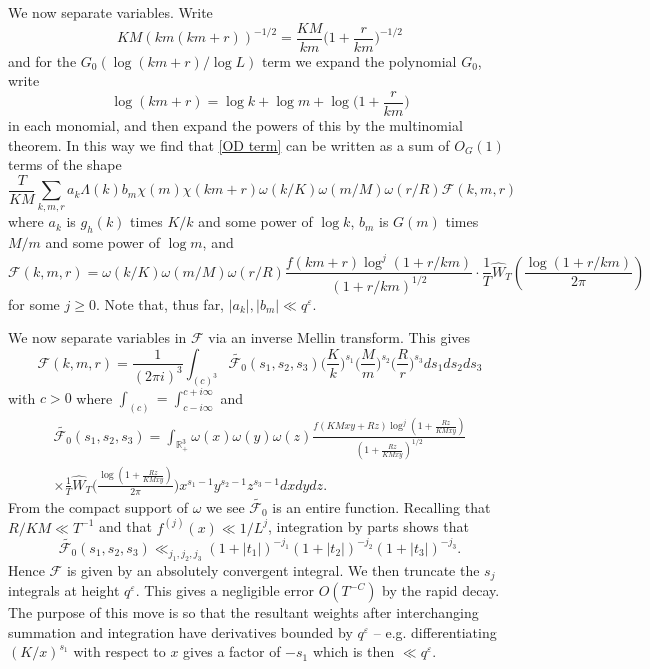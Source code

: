 \documentclass[12pt, oneside]{amsart}
\theoremstyle{definition}
\newcommand{\mb}{\mathbb}
\newcommand{\mc}{\mathcal}
\newcommand{\geqs}{\geqslant }
\newcommand{\wh}{\widehat}
\newcommand{\eps}{\varepsilon}
\newcommand{\1}{\mathds{1}}
\begin{document}
We now separate variables. Write
\[
KM(km(km+r))^{-1/2}=\frac{KM}{km}\Big(1+\frac{r}{km}\Big)^{-1/2}
\]
and for the $G_0(\log(km+r)/\log L)$ term we expand the polynomial $G_0$, write 
\[
\log(km+r)=\log k+\log m+\log\Big(1+\frac{r}{km}\Big)
\]
 in each monomial, 
and then expand the powers of this by the multinomial theorem. In this way we find that  
\eqref{OD term} can be written as a sum of $O_G(1)$ terms of the shape
\[
\frac{T}{KM}\sum_{k,m, r}a_k \Lambda(k)b_m\chi(m)\chi(km+r)\omega(k/K)\omega(m/M)\omega(r/R)\mc{F}(k,m,r)
\]
where $a_k$ is $g_h(k)$ times $K/k$ and some power of $\log k$, $b_m$ is $G(m)$ times $M/m$ and some power of $\log m$, and 
\[
\mc{F}(k,m,r)=\omega(k/K)\omega(m/M)\omega(r/R)\frac{f(km+r)\log^j(1+r/km)}{(1+r/km)^{1/2}}\cdot \frac1T\wh W_T\!\left(\frac{\log(1+r/km)}{2\pi}\right)
\]
for some $j\geqs 0$. Note that, thus far, $|a_k|,|b_m|\ll q^\eps$. 

We now separate variables in $\mc{F}$ via an inverse Mellin transform. %
This gives 
\[
\mc{F}(k,m,r)=\frac{1}{(2\pi i )^3}\int_{(c)^3} \widetilde{\mc{F}_0}(s_1,s_2,s_3)
\Big(\frac{K}{k}\Big)^{s_1}
\Big(\frac{M}{m}\Big)^{s_2}
\Big(\frac{R}{r}\Big)^{s_3}
ds_1ds_2ds_3
\] 
with $c>0$ where $\int_{(c)}=\int_{c-i\infty}^{c+i\infty}$ and 
\begin{multline*}
\widetilde{\mc{F}_0}(s_1,s_2,s_3)
=
\int_{\mb{R}_+^3}\omega(x)\omega(y)\omega(z)
\frac{f(KMxy+Rz)\log^j(1+\tfrac{Rz}{KMxy})}{(1+\tfrac{Rz}{KMxy})^{1/2}} 
\\
\times 
\frac1T\wh W_T\bigg(\frac{\log(1+\tfrac{Rz}{KMxy})}{2\pi}\bigg)
x^{s_1-1}y^{s_2-1}z^{s_3-1}dxdydz. 
\end{multline*}
From the compact support of $\omega$ we see $\widetilde{\mc{F}_0}$ is an entire function. Recalling that $R/KM\ll T^{-1}$ and that $f^{(j)}(x)\ll 1/L^j$, integration by parts shows that 
\[
\widetilde{\mc{F}_0}(s_1,s_2,s_3)
\ll_{j_1,j_2,j_3}
(1+|t_1|)^{-j_1}(1+|t_2|)^{-j_2}(1+|t_3|)^{-j_3}.
\]
Hence $\mc{F}$ is given by an absolutely convergent integral. We then truncate the $s_j$ integrals at height $q^\eps$. This gives a negligible error $O(T^{-C})$ by the rapid decay. The purpose of this move is so that the resultant weights after interchanging summation and integration have derivatives bounded by $q^\eps$ -- e.g. differentiating $(K/x)^{s_1}$ with respect to $x$ gives a factor of $-s_1$ which is then $\ll q^\eps$.    
\end{document}
